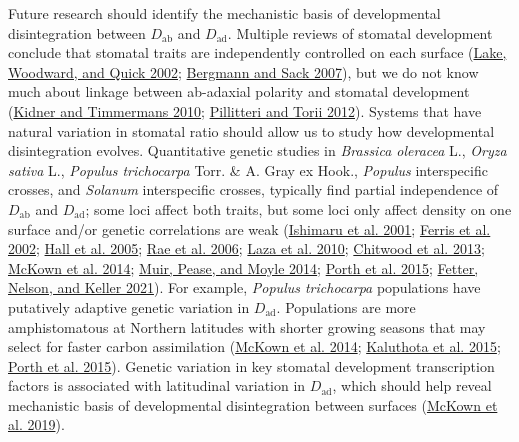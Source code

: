 \documentclass[
  12pt,
]{article}
\begin{document}
Future research should identify the mechanistic basis of developmental disintegration between \(D_\text{ab}\) and \(D_\text{ad}\). Multiple reviews of stomatal development conclude that stomatal traits are independently controlled on each surface (\protect\hyperlink{ref-lake_longdistance_2002}{Lake, Woodward, and Quick 2002}; \protect\hyperlink{ref-bergmann_stomatal_2007}{Bergmann and Sack 2007}), but we do not know much about linkage between ab-adaxial polarity and stomatal development (\protect\hyperlink{ref-kidner_signaling_2010}{Kidner and Timmermans 2010}; \protect\hyperlink{ref-pillitteri_mechanisms_2012}{Pillitteri and Torii 2012}). Systems that have natural variation in stomatal ratio should allow us to study how developmental disintegration evolves. Quantitative genetic studies in \emph{Brassica oleracea} L., \emph{Oryza sativa} L., \emph{Populus trichocarpa} Torr. \& A. Gray ex Hook., \emph{Populus} interspecific crosses, and \emph{Solanum} interspecific crosses, typically find partial independence of \(D_\text{ab}\) and \(D_\text{ad}\); some loci affect both traits, but some loci only affect density on one surface and/or genetic correlations are weak (\protect\hyperlink{ref-ishimaru_identification_2001}{Ishimaru et al. 2001}; \protect\hyperlink{ref-ferris_leaf_2002}{Ferris et al. 2002}; \protect\hyperlink{ref-hall_relationships_2005}{Hall et al. 2005}; \protect\hyperlink{ref-rae_elucidating_2006}{Rae et al. 2006}; \protect\hyperlink{ref-laza_quantitative_2010}{Laza et al. 2010}; \protect\hyperlink{ref-chitwood_quantitative_2013}{Chitwood et al. 2013}; \protect\hyperlink{ref-mckown_association_2014}{McKown et al. 2014}; \protect\hyperlink{ref-muir_quantitative_2014}{Muir, Pease, and Moyle 2014}; \protect\hyperlink{ref-porth_evolutionary_2015}{Porth et al. 2015}; \protect\hyperlink{ref-fetter_growthdefense_2021}{Fetter, Nelson, and Keller 2021}). For example, \emph{Populus trichocarpa} populations have putatively adaptive genetic variation in \(D_\text{ad}\). Populations are more amphistomatous at Northern latitudes with shorter growing seasons that may select for faster carbon assimilation (\protect\hyperlink{ref-mckown_association_2014}{McKown et al. 2014}; \protect\hyperlink{ref-kaluthota_higher_2015}{Kaluthota et al. 2015}; \protect\hyperlink{ref-porth_evolutionary_2015}{Porth et al. 2015}). Genetic variation in key stomatal development transcription factors is associated with latitudinal variation in \(D_\text{ad}\), which should help reveal mechanistic basis of developmental disintegration between surfaces (\protect\hyperlink{ref-mckown_role_2019}{McKown et al. 2019}).
\end{document}
